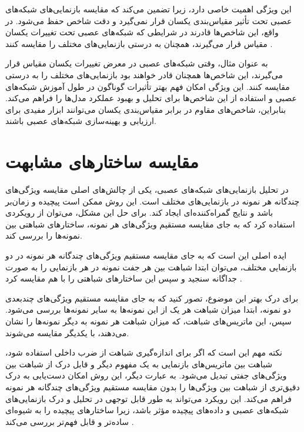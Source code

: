 این ویژگی اهمیت خاصی دارد، زیرا تضمین می‌کند که مقایسه بازنمایی‌های شبکه‌های عصبی تحت تأثیر مقیاس‌بندی یکسان قرار نمی‌گیرد و دقت شاخص حفظ می‌شود. در واقع، این شاخص‌ها قادرند در شرایطی که شبکه‌های عصبی تحت تغییرات یکسان مقیاس قرار می‌گیرند، همچنان به درستی بازنمایی‌های مختلف را مقایسه کنند
\cite{kornblith2019similarity}.

به عنوان مثال، وقتی شبکه‌های عصبی در معرض تغییرات یکسان مقیاس قرار می‌گیرند، این شاخص‌ها همچنان قادر خواهند بود بازنمایی‌های مختلف را به درستی مقایسه کنند. این ویژگی امکان فهم بهتر تأثیرات گوناگون در طول آموزش شبکه‌های عصبی و استفاده از این شاخص‌ها برای تحلیل و بهبود عملکرد مدل‌ها را فراهم می‌کند. بنابراین، شاخص‌های مقاوم در برابر مقیاس‌بندی یکسان می‌توانند ابزار مفیدی برای ارزیابی و بهینه‌سازی شبکه‌های عصبی باشند.



\section{مقایسه ساختارهای مشابهت}
در تحلیل بازنمایی‌های شبکه‌های عصبی، یکی از چالش‌های اصلی مقایسه ویژگی‌های چندگانه هر نمونه در بازنمایی‌های مختلف است. این روش ممکن است پیچیده و زمان‌بر باشد و نتایج گمراه‌کننده‌ای ایجاد کند. برای حل این مشکل، می‌توان از رویکردی استفاده کرد که به جای مقایسه مستقیم ویژگی‌های هر نمونه، ساختارهای شباهتی بین نمونه‌ها را بررسی کند.

ایده اصلی این است که به جای مقایسه مستقیم ویژگی‌های چندگانه هر نمونه در دو بازنمایی مختلف، می‌توان ابتدا شباهت بین هر جفت نمونه در هر بازنمایی را به صورت جداگانه سنجید و سپس این ساختارهای شباهتی را با هم مقایسه کرد
\cite{kornblith2019similarity}.

برای درک بهتر این موضوع، تصور کنید که به جای مقایسه مستقیم ویژگی‌های چندبعدی دو نمونه، ابتدا میزان شباهت هر یک از این نمونه‌ها به سایر نمونه‌ها بررسی می‌شود. سپس، این ماتریس‌های شباهت، که میزان شباهت هر نمونه به دیگر نمونه‌ها را نشان می‌دهند، با یکدیگر مقایسه می‌شوند.

نکته مهم این است که اگر برای اندازه‌گیری شباهت از ضرب داخلی استفاده شود، شباهت بین ماتریس‌های بازنمایی به یک مفهوم دیگر و قابل درک از شباهت بین ویژگی‌های جفتی تبدیل می‌شود. به عبارت دیگر، این روش امکان دست‌یابی به درک دقیق‌تری از شباهت بین ویژگی‌ها را بدون مقایسه مستقیم ویژگی‌های چندگانه هر نمونه فراهم می‌کند. این رویکرد می‌تواند به طور قابل توجهی در تحلیل و درک بازنمایی‌های شبکه‌های عصبی و داده‌های پیچیده مؤثر باشد، زیرا ساختارهای پیچیده را به شیوه‌ای ساده‌تر و قابل فهم‌تر بررسی می‌کند
\cite{kornblith2019similarity}.



